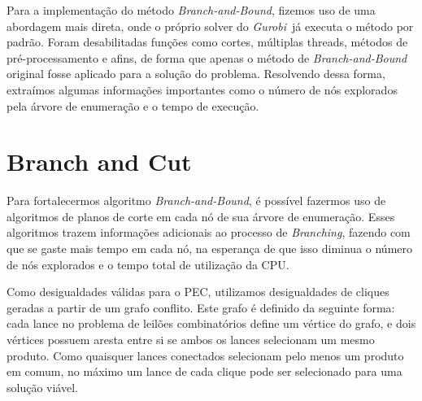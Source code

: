 \documentclass{article}
\newenvironment{algoritmo}[1][]
  {\begin{algorithm}[#1]
     \selectlanguage{brazil}%
     \floatname{algorithm}{Algoritmo}%
  }
  {\end{algorithm}}
\begin{document}
	
	Para a implementação do método \emph{Branch-and-Bound}, fizemos uso de uma abordagem mais direta, onde o próprio solver do \emph{Gurobi}\,\cite{gurobi} já executa o método por padrão. Foram desabilitadas funções como cortes, múltiplas threads, métodos de pré-processamento e afins, de forma que apenas o método de \emph{Branch-and-Bound} original fosse aplicado para a solução do problema.
	Resolvendo dessa forma, extraímos algumas informações importantes como o número de nós explorados pela árvore de enumeração e o tempo de execução.
	
	
	
	\section{Branch and Cut}\label{sec:BC}
	Para fortalecermos algoritmo \emph{Branch-and-Bound}, é possível fazermos uso de algoritmos de planos de corte em cada nó de sua árvore de enumeração.
	Esses algoritmos trazem informações adicionais ao processo de \emph{Branching},
	fazendo com que se gaste mais tempo em cada nó, na esperança de que isso diminua o número de nós explorados e o tempo total de utilização da CPU.
	
	Como desigualdades válidas para o PEC, utilizamos desigualdades de cliques geradas a partir de um grafo conflito. Este grafo é definido da seguinte forma: cada lance no problema de leilões combinatórios define um vértice do grafo,
	e dois vértices possuem aresta entre si se ambos os lances selecionam um mesmo produto. Como quaisquer lances conectados selecionam pelo menos um produto em comum, no máximo um lance de cada clique pode ser selecionado para uma solução viável.
	

            
\end{document}
